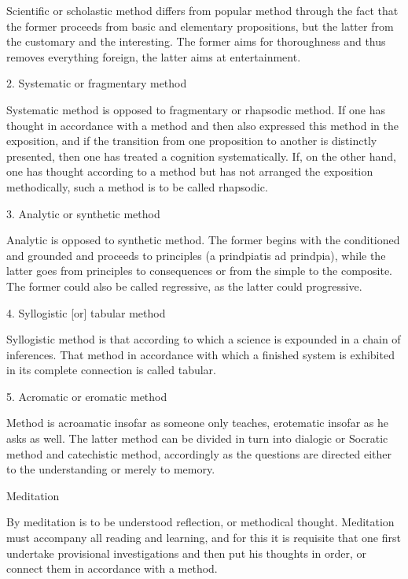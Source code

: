 Scientific or scholastic method differs from popular method
through the fact that the former proceeds from
basic and elementary propositions,
but the latter from the customary and the interesting.
The former aims for thoroughness and thus removes everything foreign,
the latter aims at entertainment.

2. Systematic or fragmentary method

Systematic method is opposed to fragmentary or rhapsodic method.
If one has thought in accordance with a method
and then also expressed this method in the exposition,
and if the transition from one proposition to
another is distinctly presented,
then one has treated a cognition systematically.
If, on the other hand, one has thought according to a method
but has not arranged the exposition methodically,
such a method is to be called rhapsodic.

3. Analytic or synthetic method

Analytic is opposed to synthetic method.
The former begins with the conditioned and grounded
and proceeds to principles (a prindpiatis ad prindpia),
while the latter goes from principles to consequences
or from the simple to the composite.
The former could also be called regressive,
as the latter could progressive.

4. Syllogistic [or] tabular method

Syllogistic method is that according to which
a science is expounded in a chain of inferences.
That method in accordance with which a finished system
is exhibited in its complete connection is called tabular.

5. Acromatic or eromatic method

Method is acroamatic insofar as someone only teaches,
erotematic insofar as he asks as well.
The latter method can be divided in turn
into dialogic or Socratic method and catechistic method,
accordingly as the questions are directed
either to the understanding or merely to memory.

Meditation

By meditation is to be understood reflection, or methodical thought.
Meditation must accompany all reading and learning,
and for this it is requisite that
one first undertake provisional investigations
and then put his thoughts in order,
or connect them in accordance with a method.
